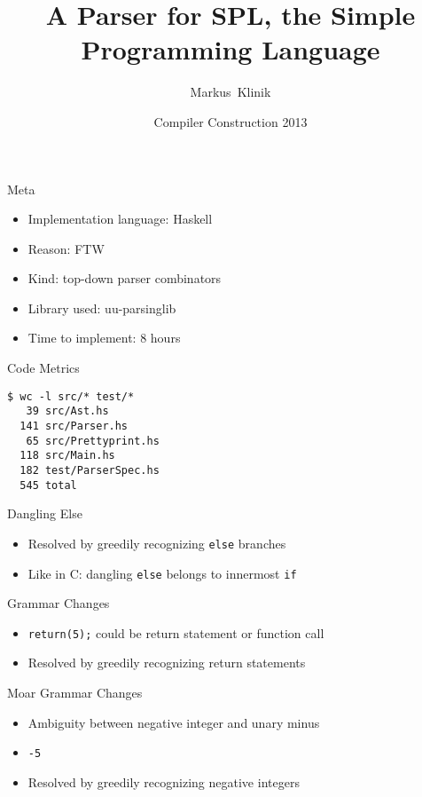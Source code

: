 \documentclass{beamer}
\title
{A Parser for SPL, the Simple Programming Language}
\author
{Markus~Klinik}
\institute[Radboud University Nijmegen] %
{
  Radboud University Nijmegen
}
\date
{Compiler Construction 2013}
\begin{document}
\begin{frame}
  \titlepage
\end{frame}

\begin{frame}{Meta}

  \begin{itemize}
    \item Implementation language: Haskell
    \item Reason: FTW
    \item Kind: top-down parser combinators
    \item Library used: uu-parsinglib
    \item Time to implement: 8 hours
  \end{itemize}

\end{frame}


\begin{frame}[fragile]{Code Metrics}

\begin{verbatim}
$ wc -l src/* test/*
   39 src/Ast.hs
  141 src/Parser.hs
   65 src/Prettyprint.hs
  118 src/Main.hs
  182 test/ParserSpec.hs
  545 total
\end{verbatim}

\end{frame}


\begin{frame}{Dangling Else}

\begin{itemize}
  \item Resolved by greedily recognizing \texttt{else} branches
  \item Like in C: dangling \texttt{else} belongs to innermost \texttt{if}
\end{itemize}

\end{frame}


\begin{frame}[fragile]{Grammar Changes}

\begin{itemize}
  \item \texttt{return(5);} could be return statement or function call
  \item Resolved by greedily recognizing return statements
\end{itemize}

\end{frame}


\begin{frame}{Moar Grammar Changes}

\begin{itemize}
  \item Ambiguity between negative integer and unary minus
  \item \texttt{-5}
  \item Resolved by greedily recognizing negative integers
\end{itemize}

\end{frame}
\end{document}
